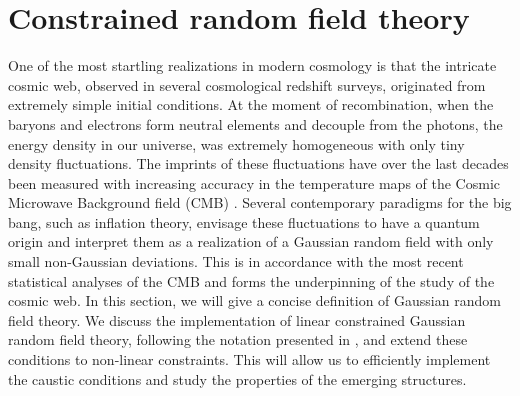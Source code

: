 \documentclass[a4paper, 11pt]{article}
\begin{document}
\section{Constrained random field theory}\label{sec:GRF}
One of the most startling realizations in modern cosmology is that the intricate cosmic web, observed in several cosmological redshift surveys, originated from extremely simple initial conditions. At the moment of recombination, when the baryons and electrons form neutral elements and decouple from the photons, the energy density in our universe, was extremely homogeneous with only tiny density fluctuations. The imprints of these fluctuations have over the last decades been measured with increasing accuracy in the temperature maps of the Cosmic Microwave Background field (CMB) \cite{WMAP:2003, Planck:2016}. Several contemporary paradigms for the big bang, such as inflation theory, envisage these fluctuations to have a quantum origin and interpret them as a realization of a Gaussian random field with only small non-Gaussian deviations. This is in accordance with the most recent statistical analyses of the CMB \cite {Creminelli:2006, Planck:2020} and forms the underpinning of the study of the cosmic web. In this section, we will give a concise definition of Gaussian random field theory. We discuss the implementation of linear constrained Gaussian random field theory, following the notation presented in \cite{Weygaert:1996}, and extend these conditions to non-linear constraints. This will allow us to efficiently implement the caustic conditions and study the properties of the emerging structures.

\end{document}
